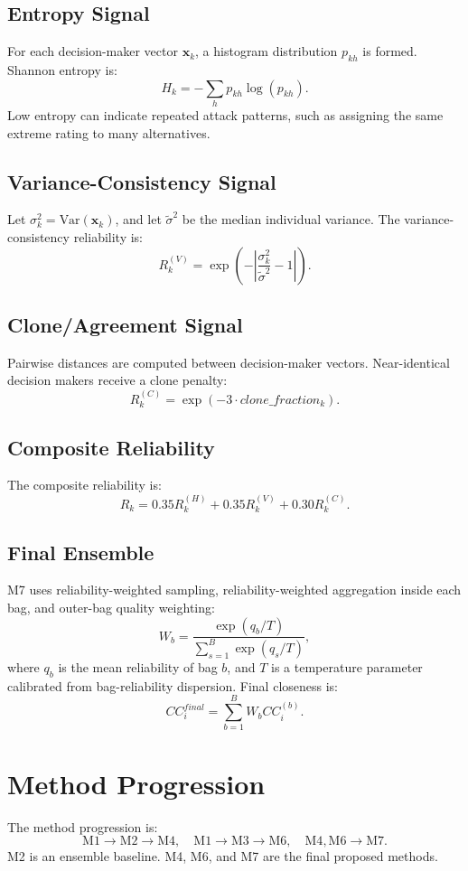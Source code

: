 \subsection{Entropy Signal}
For each decision-maker vector \(\mathbf{x}_k\), a histogram distribution \(p_{kh}\) is formed. Shannon entropy is:
\[
H_k = -\sum_h p_{kh}\log(p_{kh}).
\]
Low entropy can indicate repeated attack patterns, such as assigning the same extreme rating to many alternatives.

\subsection{Variance-Consistency Signal}
Let \(\sigma_k^2=\text{Var}(\mathbf{x}_k)\), and let \(\tilde{\sigma}^2\) be the median individual variance. The variance-consistency reliability is:
\[
R_k^{(V)} =
\exp\left(
-\left|\frac{\sigma_k^2}{\tilde{\sigma}^2}-1\right|
\right).
\]

\subsection{Clone/Agreement Signal}
Pairwise distances are computed between decision-maker vectors. Near-identical decision makers receive a clone penalty:
\[
R_k^{(C)} = \exp(-3\cdot clone\_fraction_k).
\]

\subsection{Composite Reliability}
The composite reliability is:
\[
R_k =
0.35R_k^{(H)}
+0.35R_k^{(V)}
+0.30R_k^{(C)}.
\]

\subsection{Final Ensemble}
M7 uses reliability-weighted sampling, reliability-weighted aggregation inside each bag, and outer-bag quality weighting:
\[
W_b = \frac{\exp(q_b/T)}{\sum_{s=1}^{B} \exp(q_s/T)},
\]
where \(q_b\) is the mean reliability of bag \(b\), and \(T\) is a temperature parameter calibrated from bag-reliability dispersion. Final closeness is:
\[
CC_i^{final} = \sum_{b=1}^{B} W_b CC_i^{(b)}.
\]

\section{Method Progression}
The method progression is:
\[
\text{M1} \rightarrow \text{M2} \rightarrow \text{M4}, \quad
\text{M1} \rightarrow \text{M3} \rightarrow \text{M6}, \quad
\text{M4},\text{M6} \rightarrow \text{M7}.
\]
M2 is an ensemble baseline. M4, M6, and M7 are the final proposed methods.

